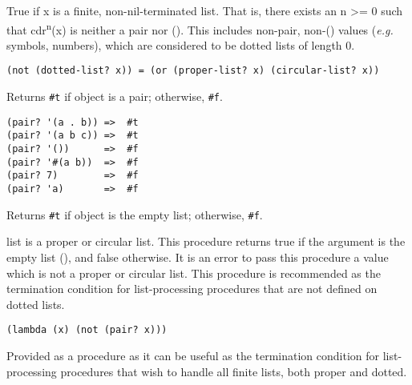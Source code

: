   \begin{entry}{%
      }

    True if x is
    a finite, non-nil-terminated list. That is, there exists an n
    \textgreater{}= 0 such that cdr\textsuperscript{n}(x) is neither a
    pair nor (). This includes non-pair, non-() values (\emph{e.g.}
    symbols, numbers), which are considered to be dotted lists of
    length 0.

\begin{verbatim}
(not (dotted-list? x)) = (or (proper-list? x) (circular-list? x))
\end{verbatim}

  \end{entry}

  \begin{entry}{%
      }

     Returns \texttt{\#t} if object is a
    pair; otherwise, \texttt{\#f}.

\begin{verbatim}
(pair? '(a . b)) =>  #t
(pair? '(a b c)) =>  #t
(pair? '())      =>  #f
(pair? '#(a b))  =>  #f
(pair? 7)        =>  #f
(pair? 'a)       =>  #f
\end{verbatim}
  \end{entry}

  \begin{entry}{%
      }

    Returns \texttt{\#t} if object is the
    empty list; otherwise, \texttt{\#f}.
  \end{entry}

  \begin{entry}{%
      }

    list is a
    proper or circular list. This procedure returns true if the
    argument is the empty list (), and false otherwise. It is an error
    to pass this procedure a value which is not a proper or circular
    list. This procedure is recommended as the termination condition
    for list-processing procedures that are not defined on dotted
    lists.
  \end{entry}

  \begin{entry}{%
      }

\begin{verbatim}
(lambda (x) (not (pair? x)))
\end{verbatim}

    Provided as a procedure as it can be useful as the termination
    condition for list-processing procedures that wish to handle all
    finite lists, both proper and dotted.
  \end{entry}


